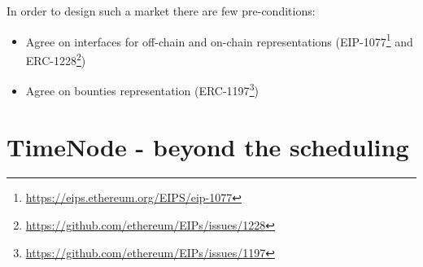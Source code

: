 \documentclass{report}
\begin{document}
  In order to design such a market there are few pre-conditions:

  \begin{itemize}
    \item Agree on interfaces for off-chain and on-chain representations (EIP-1077\footnote{\url{https://eips.ethereum.org/EIPS/eip-1077}} and ERC-1228\footnote{\url{https://github.com/ethereum/EIPs/issues/1228}})
    \item Agree on bounties representation (ERC-1197\footnote{\url{https://github.com/ethereum/EIPs/issues/1197}})
  \end{itemize}

  \section{TimeNode - beyond the scheduling}
\end{document}

